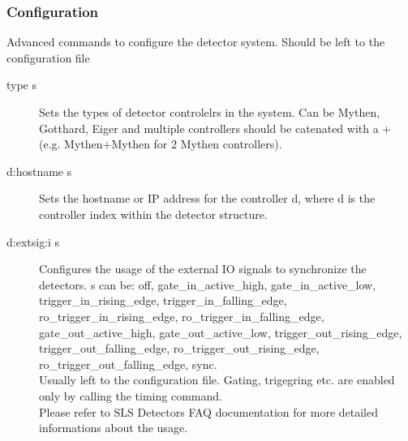 \documentclass{article}
\begin{document}
\subsubsection{Configuration}
Advanced commands to configure the detector system. Should be left to the configuration file
\begin{description}
\item[type s] Sets the types of detector controlelrs in the system. Can be Mythen, Gotthard, Eiger and multiple controllers should be catenated with a + (e.g. Mythen+Mythen for 2 Mythen controllers).
\item[d:hostname s] Sets the hostname or IP address for the controller d, where d is the controller index within the detector structure.    
\item[d:extsig:i s] Configures the usage of the external IO signals to synchronize the detectors. s can be:  off, gate\_in\_active\_high, gate\_in\_active\_low, trigger\_in\_rising\_edge,
                         trigger\_in\_falling\_edge,
                         ro\_trigger\_in\_rising\_edge,
                         ro\_trigger\_in\_falling\_edge,
                         gate\_out\_active\_high,
                         gate\_out\_active\_low,
                         trigger\_out\_rising\_edge,
                         trigger\_out\_falling\_edge,
                         ro\_trigger\_out\_rising\_edge,
                         ro\_trigger\_out\_falling\_edge, sync. \\Usually left to the configuration file. Gating, trigegring etc. are enabled only by calling the timing command. \\
Please refer to SLS Detectors FAQ documentation for more detailed informations about the usage.
      

\end{description}
\end{document}
